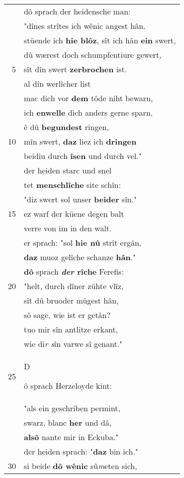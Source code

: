 \documentclass[8pt,a4paper,notitlepage]{article}
\begin{document}
\begin{table}[ht]
\begin{minipage}[t]{0.5\linewidth}
\begin{tabular}{rl}
 & dô sprach der heidensche man:\\ 
 & "dînes strîtes ich wênic angest hân.\\ 
 & stüende ich \textbf{hie blôz}, sît ich hân \textbf{ein} swert,\\ 
 & dû wærest doch schumpfentiure gewert,\\ 
5 & sît dîn swert \textbf{zerbrochen} ist.\\ 
 & al dîn werlîcher list\\ 
 & mac dich vor \textbf{dem} tôde niht bewarn,\\ 
 & ich \textbf{en}\textbf{welle} dich anders gerne sparn.\\ 
 & ê dû \textbf{begundest} ringen,\\ 
10 & mîn swert, \textbf{daz} liez ich \textbf{dringen}\\ 
 & beidiu durch \textbf{îsen} und durch vel."\\ 
 & der heiden starc und snel\\ 
 & tet \textbf{menschlîche} site schîn:\\ 
 & "diz swert sol unser \textbf{beider} sîn."\\ 
15 & ez warf der küene degen balt\\ 
 & verre von im in den walt.\\ 
 & er sprach: "sol \textbf{hie nû} strît ergân,\\ 
 & \textbf{daz} muoz gelîche schanze \textbf{hân}."\\ 
 & \textbf{dô} sprach \textbf{\textit{der} rîche} Ferefis:\\ 
20 & "helt, durch dîner zühte vlîz,\\ 
 & sît dû bruoder mügest hân,\\ 
 & sô sage, wie ist er getân?\\ 
 & tuo mir sîn antlitze erkant,\\ 
 & wie di\textit{r s}în varwe sî genant."\\ 
25 & \begin{large}D\end{large}ô sprach Herzeloyde kint:\\ 
 & "als ein geschriben permint,\\ 
 & swarz, blanc \textbf{her} und dâ,\\ 
 & \textbf{alsô} nante mir in Eckuba."\\ 
 & der heiden sprach: "\textbf{daz} bin ich."\\ 
30 & si beide \textbf{dô wênic} sû\textit{m}eten sich,\\ 

\end{tabular}
\end{minipage}
\end{table}
\end{document}
